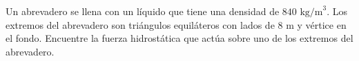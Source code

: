 \item Un abrevadero se llena con un líquido que tiene una densidad de $840 \text{ kg/m}^3$. Los extremos del abrevadero son triángulos equiláteros con lados de $8 \text{ m}$ y vértice en el fondo. Encuentre la fuerza hidrostática que actúa sobre uno de los extremos del abrevadero.
